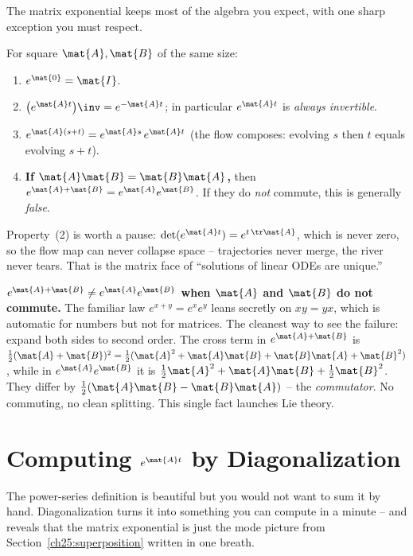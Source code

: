 The matrix exponential keeps most of the algebra you expect, with one sharp
exception you must respect.

\begin{proposition}
\label{ch25:prop-algebra}
For square $\mat{A},\mat{B}$ of the same size:
\begin{enumerate}
  \item $e^{\mat{0}} = \mat{I}$.
  \item $\bigl(e^{\mat{A}t}\bigr)\inv = e^{-\mat{A}t}$; in particular
        $e^{\mat{A}t}$ is \emph{always invertible}.
  \item $e^{\mat{A}(s+t)} = e^{\mat{A}s}\,e^{\mat{A}t}$ (the flow composes:
        evolving $s$ then $t$ equals evolving $s+t$).
  \item \textbf{If $\mat{A}\mat{B}=\mat{B}\mat{A}$,} then
        $e^{\mat{A}+\mat{B}} = e^{\mat{A}}e^{\mat{B}}$.
        If they do \emph{not} commute, this is generally \emph{false}.
\end{enumerate}
\end{proposition}

Property~(2) is worth a pause: $\det(e^{\mat{A}t}) = e^{t\,\tr\mat{A}}$, which is
never zero, so the flow map can never collapse space -- trajectories never merge,
the river never tears. That is the matrix face of ``solutions of linear ODEs are
unique.''

\begin{trapbox}
\textbf{$e^{\mat{A}+\mat{B}} \neq e^{\mat{A}}e^{\mat{B}}$ when $\mat{A}$ and
$\mat{B}$ do not commute.} The familiar law $e^{x+y}=e^xe^y$ leans secretly on
$xy=yx$, which is automatic for numbers but not for matrices. The cleanest way to
see the failure: expand both sides to second order. The cross term in
$e^{\mat{A}+\mat{B}}$ is $\tfrac12(\mat{A}+\mat{B})^2 = \tfrac12(\mat{A}^2 +
\mat{A}\mat{B} + \mat{B}\mat{A} + \mat{B}^2)$, while in $e^{\mat{A}}e^{\mat{B}}$ it
is $\tfrac12\mat{A}^2 + \mat{A}\mat{B} + \tfrac12\mat{B}^2$. They differ by
$\tfrac12(\mat{A}\mat{B}-\mat{B}\mat{A})$ -- the \emph{commutator}. No commuting,
no clean splitting. This single fact launches Lie theory.
\end{trapbox}

\section{Computing $e^{\mat{A}t}$ by Diagonalization}
\label{ch25:diag}

The power-series definition is beautiful but you would not want to sum it by hand.
Diagonalization turns it into something you can compute in a minute -- and reveals
that the matrix exponential is just the mode picture from
Section~\ref{ch25:superposition} written in one breath.

